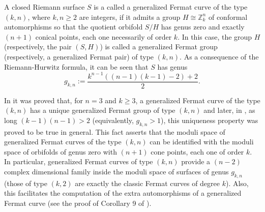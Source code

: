 \documentclass{amsart}
\begin{document}
A closed Riemann surface $S$ is a called a generalized Fermat curve of the type $(k,n)$, where $k,n \geq 2$ are integers, if it admits a group $H \cong {\mathbb Z}_{k}^{n}$ of conformal automorphisms so that the quotient orbifold $S/H$ has genus zero and exactly $(n+1)$ conical points, each one necessarily of order $k$. In this case, the group $H$ (respectively, the pair $(S,H)$) is called a generalized Fermat group (respectively, a generalized Fermat pair) of type $(k,n)$. As a consequence of the Riemann-Hurwitz formula, it can be seen that $S$ has genus
$$g_{k,n}:=\frac{k^{n-1}((n-1)(k-1)-2)+2}{2}.$$



In \cite{FGHL13} it was proved that, for $n=3$ and $k \geq 3$,  a generalized Fermat curve of the type $(k,n)$ has a unique generalized Fermat group of type $(k,n)$ and later, in \cite{HKLP16}, as long $(k-1)(n-1)>2$ (equivalently, $g_{k,n}>1$), this uniqueness property was proved to be true in general. 
 This fact asserts that 
the moduli space of generalized Fermat curves of the type $(k,n)$ can be identified with 
the moduli space of  orbifolds of genus zero with $(n+1)$ cone points, each one of order $k$. In particular, 
generalized Fermat curves of type $(k,n)$ provide a $(n-2)$ complex dimensional family inside
the moduli space of surfaces of genus $g_{k,n}$ (those of type  $(k,2)$ are exactly the classic 
Fermat curves of degree $k$). Also, this facilitates the computation of  the extra automorphisms of
a generalized Fermat curve (see the proof of Corollary 9 of \cite{GHL09}).
\end{document}

